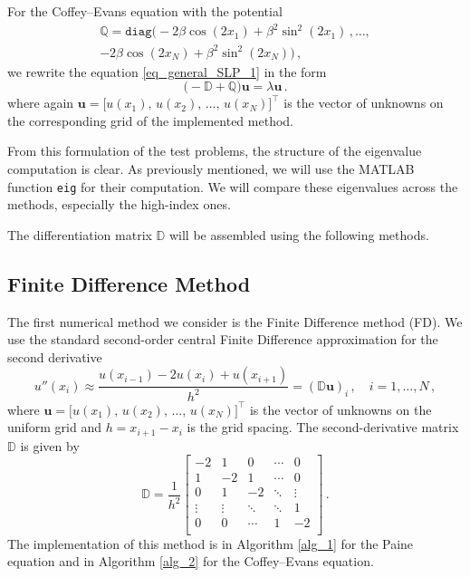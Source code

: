 \documentclass[11pt,a4paper,oneside,openright]{report} %
\begin{document}
For the Coffey--Evans equation with the potential
\begin{equation}
    \begin{split}
    \mathbb{Q} = \texttt{diag}\big(-2 \beta \cos{(2 x_1)} + \beta^2 \sin^2{(2 x_1)} \, , \dots, \\ 
    -2 \beta \cos{(2 x_N)} + \beta^2 \sin^2{(2 x_N)} \big) \, ,
    \end{split}
\end{equation}
we rewrite the equation \eqref{eq_general_SLP_1} in the form
\begin{equation}\label{eq_CE}
    \big( - \mathbb{D} + \mathbb{Q}  \big) \boldsymbol{u} = \lambda \boldsymbol{u} \, .
\end{equation} 
where again $\boldsymbol{u} = \big[u(x_1), \, u(x_2), \, \dots, \, u(x_N)\big]^\top$ is the vector of unknowns on the corresponding grid of the implemented method.

From this formulation of the test problems, the structure of the eigenvalue computation is clear. As previously mentioned, we will use the MATLAB function \texttt{eig} for their computation. We will compare these eigenvalues across the methods, especially the high-index ones.

The differentiation matrix $\mathbb{D}$ will be assembled using the following methods.

\subsection{Finite Difference Method}
\noindent
The first numerical method we consider is the Finite Difference method (FD). We use the standard second-order central Finite Difference approximation for the second derivative
\begin{equation}
    u''(x_i) \approx \frac{u(x_{i-1}) - 2 u(x_i) + u(x_{i+1}) }{h^2} = \left( \mathbb{D} \boldsymbol{u} \right)_i \, , \quad i = 1, \dots, N \, ,
\end{equation}
where $\boldsymbol{u} = \big[u(x_1), \, u(x_2), \, \dots, \, u(x_N) \big]^\top$ is the vector of unknowns on the uniform grid and $h = x_{i+1}-x_i$ is the grid spacing. The second-derivative matrix $\mathbb{D}$ is given by
\begin{equation}
\mathbb{D} = \frac{1}{h^2} \begin{bmatrix}
    - 2 & 1 & 0  & \cdots & 0 \\
    1 & - 2 & 1 & \cdots & 0 \\
    0 & 1 & - 2  & \ddots & \vdots \\ 
    \vdots  & \vdots & \ddots & \ddots & 1 \\
    0 & 0 & \cdots & 1 & -2 \\ 
\end{bmatrix} \, .
\end{equation}
The implementation of this method is in Algorithm \ref{alg_1} for the Paine equation and in Algorithm \ref{alg_2} for the Coffey--Evans equation.
\end{document}
